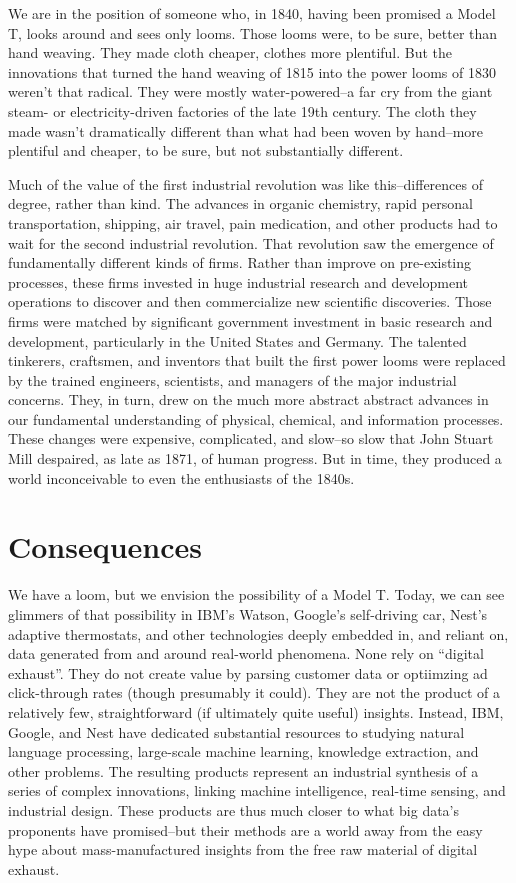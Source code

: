 \documentclass[12pt]{article}
\begin{document}
We are in the position of someone who, in 1840, having been promised a
Model T, looks around and sees only looms. Those looms were, to be
sure, better than hand weaving. They made cloth cheaper, clothes more
plentiful. But the innovations that turned the hand weaving of
1815 into the power looms of 1830 weren't that radical. They were
mostly water-powered--a far cry from the giant steam- or
electricity-driven factories of the late 19th century. The cloth they
made wasn't dramatically different than what had been woven by
hand--more plentiful and cheaper, to be sure, but not substantially
different.  

Much of the value of the first industrial revolution was like
this--differences of degree, rather than kind. The advances in organic
chemistry, rapid personal transportation, shipping, air travel, pain
medication, and other products had to wait for the second industrial
revolution. That revolution saw the emergence of fundamentally
different kinds of firms. Rather than improve on pre-existing
processes, these firms invested in huge industrial research and
development operations to discover and then commercialize new
scientific discoveries. Those firms were matched by significant
government investment in basic research and development, particularly
in the United States and Germany. The talented tinkerers, craftsmen,
and inventors that built the first power looms were replaced by the
trained engineers, scientists, and managers of the major industrial
concerns. They, in turn, drew on the much more abstract abstract
advances in our fundamental understanding of physical, chemical, and
information processes. These changes were expensive, complicated, and
slow--so slow that John Stuart Mill despaired, as late as 1871, of
human progress. But in time, they produced a world inconceivable to
even the enthusiasts of the 1840s. 


\section{Consequences}
\label{sec:consequences}

We have a loom, but we envision the possibility of a Model T. Today,
we can see glimmers of that possibility in IBM's Watson, Google's
self-driving car, Nest's adaptive thermostats, and other technologies
deeply embedded in, and reliant on, data generated from and around
real-world phenomena. None rely on ``digital exhaust''. They do not
create value by parsing customer data or optiimzing ad click-through
rates (though presumably it could). They are not the product of a
relatively few, straightforward (if ultimately quite useful)
insights. Instead, IBM, Google, and Nest have dedicated substantial
resources to studying natural language processing, large-scale machine
learning, knowledge extraction, and other problems. The resulting
products represent an industrial synthesis of a series of complex
innovations, linking machine intelligence, real-time sensing, and
industrial design. These products are thus much closer to what big
data's proponents have promised--but their methods are a world away
from the easy hype about mass-manufactured insights from the free raw
material of digital exhaust.
\end{document}
